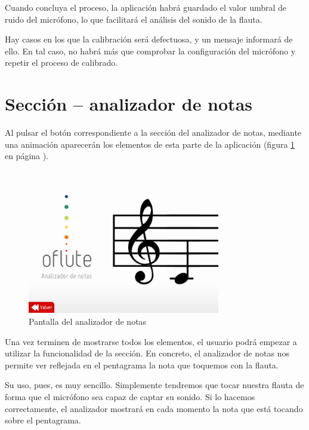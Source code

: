 Cuando concluya el proceso, la aplicación habrá guardado el valor umbral de
ruido del micrófono, lo que facilitará el análisis del sonido de la flauta.

Hay casos en los que la calibración será defectuosa, y un mensaje informará de
ello. En tal caso, no habrá más que comprobar la configuración del micrófono y
repetir el proceso de calibrado.

\section{Sección -- analizador de notas}

Al pulsar el botón correspondiente a la sección del analizador de notas,
mediante una animación aparecerán los elementos de esta parte de la aplicación
(figura \ref{fig:pantalla_analizador_notas} en página
\pageref{fig:pantalla_analizador_notas}).

\begin{figure}[h!]
  \vspace{-0.1cm}
  \centering
  \includegraphics[width=0.75\textwidth]{apendice_manual_usuario/imagen_seccionAnalizador}
  \caption{Pantalla del analizador de notas}
  \label{fig:pantalla_analizador_notas}
\end{figure}

Una vez terminen de mostrarse todos los elementos, el usuario podrá empezar a
utilizar la funcionalidad de la sección. En concreto, el analizador de notas nos
permite ver reflejada en el pentagrama la nota que toquemos con la flauta.

Su uso, pues, es muy sencillo. Simplemente tendremos que tocar nuestra flauta de
forma que el micrófono sea capaz de captar su sonido. Si lo hacemos
correctamente, el analizador mostrará en cada momento la nota que está tocando
sobre el pentagrama.

